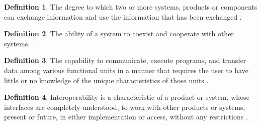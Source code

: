 \documentclass[letterpaper,cleveref]{lipics-v2019}
\theoremstyle{definition}
\newtheorem{defn}{Definition}
\begin{document}
\begin{defn}
  \label{InteroperabilitySelected}
  The degree to which two or more systems, products or components can exchange
  information and use the information that has been exchanged
  \citep{ISO/IEC25010}.
\end{defn}

\begin{defn}
  The ability of a system to coexist and cooperate with other systems.
  \citep{ghezzi1991fundamentals}.
\end{defn}

\begin{defn}
  The capability to communicate, execute programs, and transfer data among
  various functional units in a manner that requires the user to have little or
  no knowledge of the unique characteristics of those units
  \citep{ISO/IEC/IEEE24765}.
\end{defn}

\begin{defn}
  Interoperability is a characteristic of a product or system, whose interfaces
  are completely understood, to work with other products or systems, present or
  future, in either implementation or access, without any restrictions
  \citep{AFUL2019}.
\end{defn}
\end{document}
